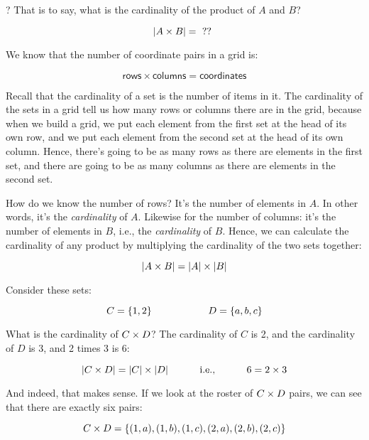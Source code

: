 \documentclass[../../../main.tex]{subfiles}
\begin{document}
? That is to say, what is the cardinality of the product of $A$ and $B$?

\begin{equation*}
  |A \times B| = \text{ ?? }
\end{equation*}

We know that the number of coordinate pairs in a grid is:

\begin{equation*}
  \mathsf{rows} \times \mathsf{columns} = \mathsf{coordinates}
\end{equation*}

\begin{aside}
  \begin{remark}
    Recall that the cardinality of a set is the number of items in it. The cardinality of the sets in a grid tell us how many rows or columns there are in the grid, because when we build a grid, we put each element from the first set at the head of its own row, and we put each element from the second set at the head of its own column. Hence, there's going to be as many rows as there are elements in the first set, and there are going to be as many columns as there are elements in the second set.
  \end{remark}
\end{aside}

How do we know the number of rows? It's the number of elements in $A$. In other words, it's the \emph{cardinality} of $A$. Likewise for the number of columns: it's the number of elements in $B$, i.e., the \emph{cardinality} of $B$. Hence, we can calculate the cardinality of any product by multiplying the cardinality of the two sets together:

\begin{equation*}
  |A \times B| = |A| \times |B|
\end{equation*}

\begin{example}

Consider these sets:

\begin{equation*}
  C = \{ 1, 2 \} \hskip 2cm D = \{ a, b, c \}
\end{equation*}

What is the cardinality of $C \times D$? The cardinality of $C$ is 2, and the cardinality of $D$ is 3, and 2 times 3 is 6:

\begin{equation*}
  |C \times D| = |C| \times |D| \hskip 1cm \text{ i.e., } \hskip 1cm 6 = 2 \times 3
\end{equation*}

And indeed, that makes sense. If we look at the roster of $C \times D$ pairs, we can see that there are exactly six pairs:

\begin{equation*}
  C \times D = \{ (1, a), (1, b), (1, c), (2, a), (2, b), (2, c) \}
\end{equation*}

\end{example}
\end{document}
